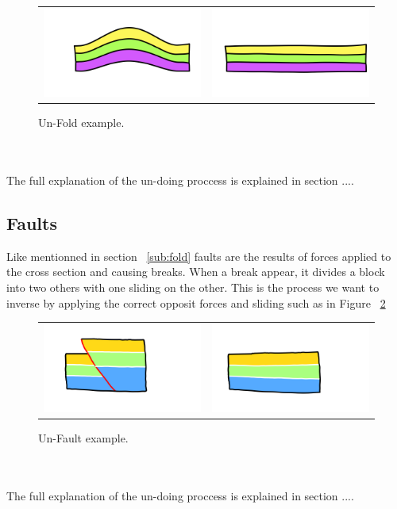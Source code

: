 \documentclass[12pt, a4paper]{report} %
\begin{document}
\begin{figure}[htb]
\centering
\begin{tabular}{@{}cc@{}}
\includegraphics[width=.35\textwidth]{unFoldDescription0.png}&
\includegraphics[width=.35\textwidth]{unFoldDescription1.png}\\
\end{tabular}
\caption{Un-Fold example.}
\label{unfoldeg}
\end{figure}\\\\
The full explanation of the un-doing proccess is explained in section ....

\subsection{Faults}
Like mentionned in section ~\ref{sub:fold} faults are the results of forces applied to the cross section and causing breaks. When a break appear, it divides a block into two others with one sliding on the other. This is the process we want to inverse by applying the correct opposit forces and sliding such as in Figure ~\ref{unfaulteg}

\begin{figure}[htb]
\centering
\begin{tabular}{@{}cc@{}}
\includegraphics[width=.35\textwidth]{unFaultDescription0.png}&
\includegraphics[width=.35\textwidth]{unFaultDescription1.png}\\
\end{tabular}
\caption{Un-Fault example.}
\label{unfaulteg}
\end{figure}\\\\
The full explanation of the un-doing proccess is explained in section ....
\end{document}
